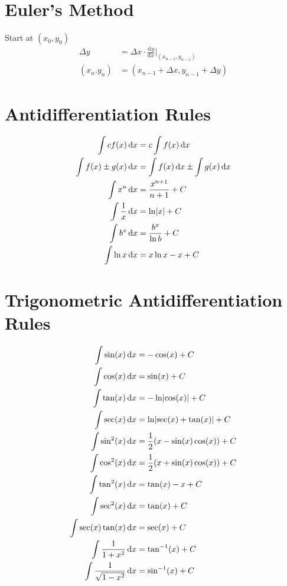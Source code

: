 \documentclass[12pt]{article}
\DeclarePairedDelimiter\abs{\lvert}{\rvert}
\newcommand*{\fixmath}{\makebox{}\vspace{\glueexpr-\baselineskip-\abovedisplayskip}}
\newcommand*{\asin}{\sin^{-1}}
\newcommand*{\atan}{\tan^{-1}}
\newcommand*{\dd}[3][]{\tfrac{\mathrm{d}^{#1}#2}{\mathrm{d}#3^{#1}}}
\newcommand*{\D}[1]{\mathop{}\!\mathrm{d} #1}
\newenvironment{rmbskip}{\setlength{\belowdisplayskip}{0pt}\ignorespaces}%
  {\ignorespacesafterend}
\newenvironment{rmskip}{\setlength{\abovedisplayskip}{0pt}%
  \setlength{\belowdisplayskip}{0pt}\fixmath\ignorespaces}%
  {\ignorespacesafterend}
\begin{document}
\section*{Euler's Method}
Start at \((x_0,y_0)\)
\begin{rmbskip}
  \begin{align*}
    \Delta y &= \Delta x \cdot \dd{y}{x} \bigg|_{(x_{n-1},y_{n-1})}\\
    (x_n.y_n) &= (x_{n-1} + \Delta x, y_{n-1} + \Delta y)
  \end{align*}
\end{rmbskip}
\section*{Antidifferentiation Rules}
\begin{rmskip}
  \begin{align*}
    \int cf(x) \D{x} &= c \int f(x) \D{x}\\
    \int f(x) \pm g(x) \D{x} &= \int f(x) \D{x} \pm \int g(x) \D{x}\\
    \int x^n \D{x} &= \frac{x^{n+1}}{n+1} + C\\
    \int \frac{1}{x} \D{x} &= \ln\abs*{x} + C\\
    \int b^x \D{x} &= \frac{b^x}{\ln b} + C\\
    \int \ln x \D{x} &= x\ln x - x + C
  \end{align*}
\end{rmskip}
\section*{Trigonometric Antidifferentiation Rules}
\begin{rmskip}
  \begin{align*}
    \int \sin(x) \D{x} &= -\cos(x) + C\\
    \int \cos(x) \D{x} &= \sin(x) + C\\
    \int \tan(x) \D{x} &= -\ln\abs*{\cos(x)} + C\\
    \int \sec(x) \D{x} &= \ln\abs*{\sec(x)+\tan(x)} + C\\
    \int \sin^2(x) \D{x} &= \frac{1}{2} (x - \sin(x)\cos(x)) + C\\
    \int \cos^2(x) \D{x} &= \frac{1}{2} (x + \sin(x)\cos(x)) + C\\
    \int \tan^2(x) \D{x} &= \tan(x) - x + C\\
    \int \sec^2(x) \D{x} &= \tan(x) + C\\
    \int \sec(x) \tan(x) \D{x} &= \sec(x) + C\\
    \int \frac{1}{1+x^2} \D{x} &= \atan(x) + C\\
    \int \frac{1}{\sqrt{1-x^2}} \D{x} &= \asin(x) + C
  \end{align*}
\end{rmskip}
\end{document}
